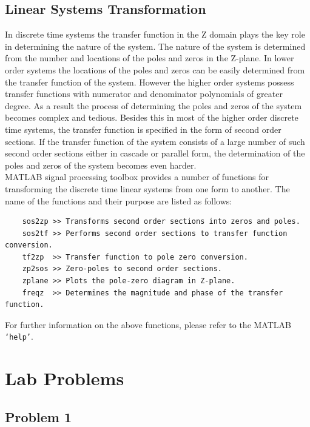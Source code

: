 \documentclass[a4paper,11pt]{article}
\begin{document}
\subsection{Linear Systems Transformation}
In discrete time systems the transfer function in the Z domain plays the key role in determining the nature of the system. The nature of the system is determined from the number and locations of the poles and zeros in the Z-plane. In lower order systems the locations of the poles and zeros can be easily determined from the transfer function of the system. However the higher order systems possess transfer functions with numerator and denominator polynomials of greater degree. As a result the process of determining the poles and zeros of the system becomes complex and tedious. Besides this in most of the higher order discrete time systems, the transfer function is specified in the form of second order sections. If the transfer function of the system consists of a large number of such second order sections either in cascade or parallel form, the determination of the poles and zeros of the system becomes even harder.\\

MATLAB signal processing toolbox provides a number of functions for transforming the discrete time linear systems from one form to another. The name of the functions and their purpose are listed as follows:
\begin{verbatim} 
    sos2zp >> Transforms second order sections into zeros and poles.
    sos2tf >> Performs second order sections to transfer function conversion.
    tf2zp  >> Transfer function to pole zero conversion.
    zp2sos >> Zero-poles to second order sections.
    zplane >> Plots the pole-zero diagram in Z-plane.
    freqz  >> Determines the magnitude and phase of the transfer function.
\end{verbatim}

For further information on the above functions, please refer to the MATLAB \texttt{‘help’}.


\section {Lab Problems}


\subsection{Problem 1}
\end{document}
